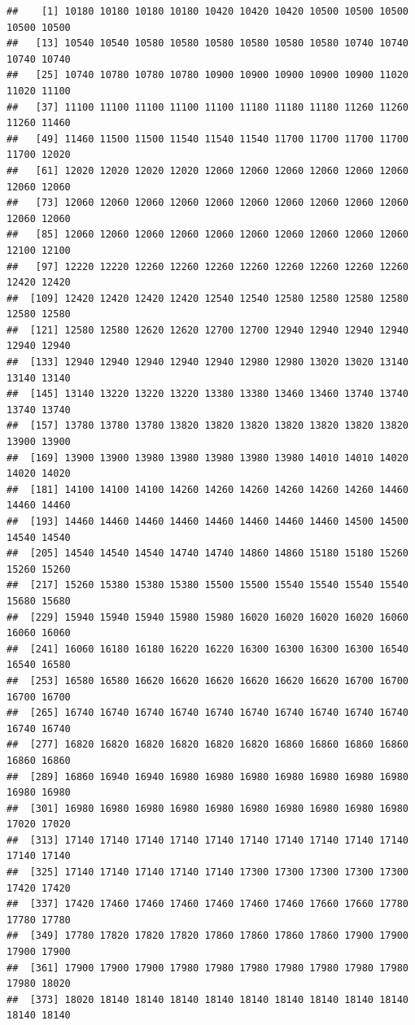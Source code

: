 \documentclass[
  12pt,
]{article}
\begin{document}
\begin{verbatim}
##    [1] 10180 10180 10180 10180 10420 10420 10420 10500 10500 10500 10500 10500
##   [13] 10540 10540 10580 10580 10580 10580 10580 10580 10740 10740 10740 10740
##   [25] 10740 10780 10780 10780 10900 10900 10900 10900 10900 11020 11020 11100
##   [37] 11100 11100 11100 11100 11100 11180 11180 11180 11260 11260 11260 11460
##   [49] 11460 11500 11500 11540 11540 11540 11700 11700 11700 11700 11700 12020
##   [61] 12020 12020 12020 12020 12060 12060 12060 12060 12060 12060 12060 12060
##   [73] 12060 12060 12060 12060 12060 12060 12060 12060 12060 12060 12060 12060
##   [85] 12060 12060 12060 12060 12060 12060 12060 12060 12060 12060 12100 12100
##   [97] 12220 12220 12260 12260 12260 12260 12260 12260 12260 12260 12420 12420
##  [109] 12420 12420 12420 12420 12540 12540 12580 12580 12580 12580 12580 12580
##  [121] 12580 12580 12620 12620 12700 12700 12940 12940 12940 12940 12940 12940
##  [133] 12940 12940 12940 12940 12940 12980 12980 13020 13020 13140 13140 13140
##  [145] 13140 13220 13220 13220 13380 13380 13460 13460 13740 13740 13740 13740
##  [157] 13780 13780 13780 13820 13820 13820 13820 13820 13820 13820 13900 13900
##  [169] 13900 13900 13980 13980 13980 13980 13980 14010 14010 14020 14020 14020
##  [181] 14100 14100 14100 14260 14260 14260 14260 14260 14260 14460 14460 14460
##  [193] 14460 14460 14460 14460 14460 14460 14460 14460 14500 14500 14540 14540
##  [205] 14540 14540 14540 14740 14740 14860 14860 15180 15180 15260 15260 15260
##  [217] 15260 15380 15380 15380 15500 15500 15540 15540 15540 15540 15680 15680
##  [229] 15940 15940 15940 15980 15980 16020 16020 16020 16020 16060 16060 16060
##  [241] 16060 16180 16180 16220 16220 16300 16300 16300 16300 16540 16540 16580
##  [253] 16580 16580 16620 16620 16620 16620 16620 16620 16700 16700 16700 16700
##  [265] 16740 16740 16740 16740 16740 16740 16740 16740 16740 16740 16740 16740
##  [277] 16820 16820 16820 16820 16820 16820 16860 16860 16860 16860 16860 16860
##  [289] 16860 16940 16940 16980 16980 16980 16980 16980 16980 16980 16980 16980
##  [301] 16980 16980 16980 16980 16980 16980 16980 16980 16980 16980 17020 17020
##  [313] 17140 17140 17140 17140 17140 17140 17140 17140 17140 17140 17140 17140
##  [325] 17140 17140 17140 17140 17140 17300 17300 17300 17300 17300 17420 17420
##  [337] 17420 17460 17460 17460 17460 17460 17460 17660 17660 17780 17780 17780
##  [349] 17780 17820 17820 17820 17860 17860 17860 17860 17900 17900 17900 17900
##  [361] 17900 17900 17900 17980 17980 17980 17980 17980 17980 17980 17980 18020
##  [373] 18020 18140 18140 18140 18140 18140 18140 18140 18140 18140 18140 18140

\end{verbatim}
\end{document}
